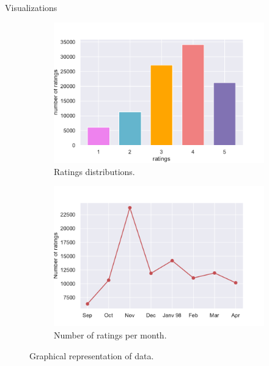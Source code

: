 \documentclass[unknownkeysallowed]{beamer}
\begin{document}
\addtocounter{framenumber}{-1}
\begin{frame}{Visualizations}
  \begin{figure}[H]
\centering
\begin{subfigure}{.5\textwidth}
  \centering
  \includegraphics[width=1\linewidth]{./images/distrib_notes.pdf}
  \caption{Ratings distributions.}
  \label{fig:distri_notes}
\end{subfigure}%
\begin{subfigure}{.5\textwidth}
  \centering
  \includegraphics[width=1\linewidth, clip,trim={0cm 0cm 0cm 0.6cm} ]{./images/notes_mois.pdf}
  \caption{Number of ratings per month.}
  \label{fig:resid_}
\end{subfigure}
\caption{Graphical representation of data.}
\label{fig:notes_mois}
\end{figure}
\end{frame}
\end{document}
